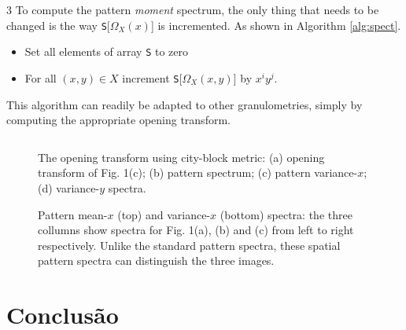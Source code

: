 \documentclass{sciposter}
\begin{document}
\begin{multicols}{3}
To compute the pattern \emph{moment} spectrum, the only thing that needs to be
changed is the way {\tt S}[$\Omega_X(x)$] is incremented. As shown in Algorithm
\ref{alg:spect}.

\begin{algorithm}
\begin{itemize}
\item Set all elements of array {\tt S} to zero
\item For all $(x,y) \in X$ increment {\tt S}[$\Omega_X(x,y)$] by 
$x^iy^j$. 
\end{itemize}
\caption{ Algorithm for computation of pattern moment
spectrum of order $ij$. \label{alg:spect}}
\end{algorithm}

This algorithm can 
readily be adapted to other granulometries, simply by computing the 
appropriate opening transform.

\begin{figure}
\begin{center}
\begin{tabular}{c c}

\end{tabular}
\end{center}
\caption{ \label{fig:tauspect} 
The opening transform using city-block metric: (a) opening transform of
Fig. 1(c); (b) pattern spectrum; (c) pattern variance-$x$; 
(d) variance-$y$ spectra.}
\end{figure}


\renewcommand{\imsize}{0.3\columnwidth}
\begin{figure}
\begin{center}
\end{center}
\caption{ \label{fig:binspect} Pattern mean-$x$ (top) and variance-$x$ 
(bottom) spectra: the three collumns show spectra for Fig. 1(a), (b) and (c) 
from left to right respectively.  Unlike the standard pattern spectra, 
these spatial pattern spectra can distinguish the three images.}
\end{figure}

\section{Conclusão}


\end{multicols}
\end{document}

